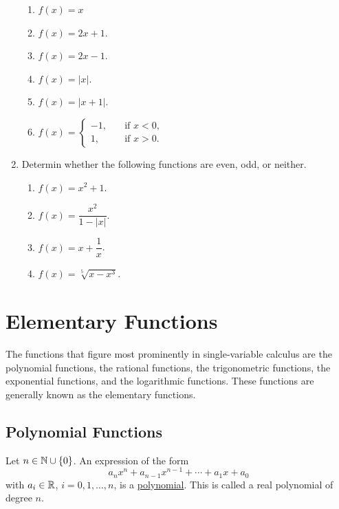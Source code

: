 \documentclass[11pt]{book}
\begin{document}
\begin{enumerate}[label=\arabic*.]
\begin{multicols}{2}
\begin{enumerate}
            \item $f(x)=x$
            \item $f(x)=2x+1$.
            \item $f(x)=2x-1$.
            \item $f(x)=|x|$.
            \item $f(x)=|x+1|$.
            \item $f(x)=\left\{\begin{array}{ll}
                -1,\quad&\text{if $x<0$,}\\1,\quad&\text{if $x>0$}.
            \end{array}\right.$
        \end{enumerate}
    \end{multicols}
    \item Determin whether the following functions are even, odd, or neither.
    \begin{multicols}{2}
        \begin{enumerate}
            \item $f(x)=x^2+1$.
            \item $f(x)=\dfrac{x^2}{1-|x|}$.
            \item $f(x)=x+\dfrac{1}{x}$.
            \item $f(x)=\sqrt[5]{x-x^3}$.
        \end{enumerate}
    \end{multicols}
\end{enumerate}

\section{Elementary Functions}

The functions that figure most prominently in single-variable calculus are the polynomial functions, the rational functions, the trigonometric functions, the exponential functions, and the logarithmic functions. These functions are generally known as the elementary functions.

\subsection*{Polynomial Functions}

\begin{definition}[Polynomial]
    Let $n\in\mathbb{N}\cup\{0\}$. An expression of the form $$a_nx^n+a_{n-1}x^{n-1}+\cdots+a_1x+a_0$$ with $a_i\in\mathbb{R}$, $i=0, 1, \dots, n$, is a \underline{polynomial}. This is called a real polynomial of degree $n$.
\end{definition}
\end{document}
